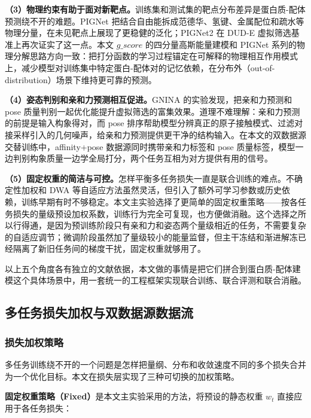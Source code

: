 \textbf{（3）物理约束有助于面对新靶点。}训练集和测试集的靶点分布差异是蛋白质-配体预测绕不开的难题。PIGNet 把结合自由能拆成范德华、氢键、金属配位和疏水等物理分量，在未见靶点上展现了更稳健的泛化；PIGNet2 在 DUD-E 虚拟筛选基准上再次证实了这一点\cite{moon2022pignet,moon2024pignet2}。本文 $g\_score$ 的四分量高斯能量建模和 PIGNet 系列的物理分解思路方向一致：把打分函数的学习过程锚定在可解释的物理相互作用模式上，减少模型对训练集中特定蛋白-配体对的记忆依赖，在分布外（out-of-distribution）场景下维持更可靠的预测。

\textbf{（4）姿态判别和亲和力预测相互促进。}GNINA 的实验发现，把亲和力预测和 pose 质量判别一起优化能提升虚拟筛选的富集效果\cite{mcnutt2021gnina}。道理不难理解：亲和力预测的前提是输入构象得对，而 pose 排序帮助模型分辨真正的原子接触模式、过滤对接采样引入的几何噪声，给亲和力预测提供更干净的结构输入。在本文的双数据源交替训练中，affinity+pose 数据源同时携带亲和力标签和 pose 质量标签，模型一边判别构象质量一边学全局打分，两个任务互相为对方提供有用的信号。

\textbf{（5）固定权重的简洁与可控。}怎样平衡多任务损失一直是联合训练的难点。不确定性加权\cite{kendall2018multi}和 DWA\cite{liu2019end} 等自适应方法虽然灵活，但引入了额外可学习参数或历史依赖，训练早期有时不够稳定。本文主实验选择了更简单的固定权重策略——按各任务损失的量级预设加权系数，训练行为完全可复现，也方便做消融。这个选择之所以行得通，是因为预训练阶段只有亲和力和姿态两个量级相近的任务，不需要复杂的自适应调节；微调阶段虽然加了量级较小的能量监督，但主干冻结和渐进解冻已经隔离了新旧任务间的梯度干扰，固定权重就够用了。

以上五个角度各有独立的文献依据\cite{caruana1997multitask,jumper2021highly,moon2022pignet,mcnutt2021gnina}，本文做的事情是把它们拼合到蛋白质-配体建模这个具体场景中，用一套统一的工程框架实现联合训练、联合评测和联合消融。

\subsection{多任务损失加权与双数据源数据流}

\subsubsection{损失加权策略}

多任务训练绕不开的一个问题是怎样把量纲、分布和收敛速度不同的多个损失合并为一个优化目标\cite{chen2018gradnorm}。本文在损失层实现了三种可切换的加权策略。

\textbf{固定权重策略（Fixed）}是本文主实验采用的方法，将预设的静态权重 $w_t$ 直接应用于各任务损失：

